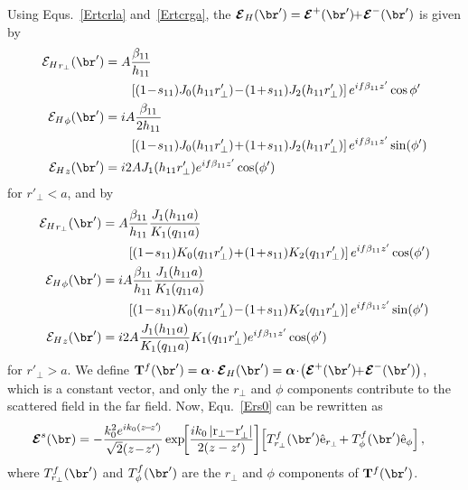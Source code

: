 \documentclass[]{report}
\begin{document}
Using Equs.~\ref{Ertcrla} and~\ref{Ertcrga}, the $ \boldsymbol{\mathcal{E}}_H (\br')= \boldsymbol{\mathcal{E}}^+ (\br') \!\! +\! \boldsymbol{\mathcal{E}}^- (\br') $ is given by
\begin{subequations}
\label{EHrcrla}
\begin{align}
{\mathcal{E}_H}_{r_\perp} (\br') &= A\frac{\beta_{11}}{h_{11}}\nonumber\\
&\qquad \left[ (1\!-\!s_{11})J_0(h_{11}r'_\perp)\!-\! (1\!+\!s_{11})J_2(h_{11}r_\perp') \right]e^{if\beta_{11} z'}\cos{\phi'}\\
{\mathcal{E}_H}_\phi(\br') &=  iA \frac{\beta_{11}}{2h_{11}} \nonumber\\
&\qquad \left[ (1\!-\!s_{11})J_0(h_{11}r'_\perp)\! +\! (1\!+\!s_{11})J_2(h_{11}r'_\perp) \right] e^{if\beta_{11} z' }\sin(\phi')\\
{\mathcal{E}_H}_z(\br') &= i2A J_1(h_{11}r'_\perp) e^{if\beta_{11} z'}\cos(\phi')
\end{align}
\end{subequations}
for $ r'_\perp<a $, and by
\begin{subequations}
\label{EHrpcrga}
\begin{align}
{\mathcal{E}_H}_{r_\perp}(\br') &=A\frac{\beta_{11}}{h_{11}}\frac{J_1(h_{11}a)}{K_1(q_{11}a)}\nonumber\\ 
&\qquad \left[ (1\!-\!s_{11})K_0(q_{11}r'_\perp)\!+\!(1 \!+\! s_{11})K_2(q_{11}r'_\perp) \right]e^{if\beta_{11} z' }\cos(\phi')\\
{\mathcal{E}_H}_\phi(\br') &=  iA \frac{\beta_{11}}{h_{11}} \frac{J_1(h_{11}a)}{K_1(q_{11}a)}\nonumber\\ 
&\qquad \left[ (1\!-\!s_{11})K_0(q_{11}r'_\perp) \! -\! (1\!+\!s_{11})K_2(q_{11}r'_\perp) \right] e^{if\beta_{11} z'}\sin(\phi')\\
{\mathcal{E}_H}_z(\br') &= i2A \frac{J_1(h_{11}a)}{K_1(q_{11}a)} K_1(q_{11}r'_\perp) e^{if\beta_{11} z'}\cos(\phi')
\end{align}
\end{subequations}
for $ r'_\perp>a $. We define $ \mathbf{T}^{f}(\br')= \boldsymbol{\alpha}\!\cdot \boldsymbol{\mathcal{E}}_H (\br') = \boldsymbol{\alpha}\!\cdot\! \left(\boldsymbol{\mathcal{E}}^+ (\br') \!\! +\! \boldsymbol{\mathcal{E}}^- (\br') \right) $, which is a constant vector, and only the $ r_\perp $ and $ \phi $ components contribute to the scattered field in the far field. Now, Equ.~\ref{Ers0} can be rewritten as
\begin{align}
\boldsymbol{\mathcal{E}}^s(\br) &=- \frac{k_0^2 e^{ik_0(z\!-\!z'\!)}}{\sqrt{2}(z\!-\!z')} \exp\!\! \left[ \frac{ik_0 \left| \mathrm{r}_\perp\!\! -\! \mathrm{r}_\perp'\right|}{2(z-z')}  \right]\! \left[ T_{r_\perp}^f(\br') \hat{\mathrm{e}}_{r_\perp} \! + T^f_\phi (\br') \hat{\mathrm{e}}_{\phi} \right],
\end{align}
where $ T^f_{r_\perp}(\br') $ and $ T^f_\phi (\br') $ are the $ r_\perp $ and $ \phi $ components of $ \mathbf{T}^f(\br')$. 
\end{document}
